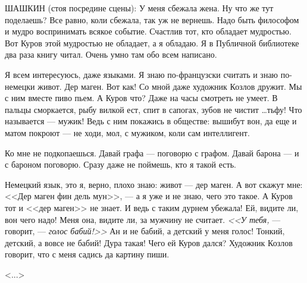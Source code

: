 ШАШКИН (стоя посредине сцены): У меня сбежала жена. Ну что же тут поделаешь? Все равно, коли сбежала, так уж не вернешь. Надо быть философом и мудро воспринимать всякое событие. Счастлив тот, кто обладает мудростью. Вот Куров этой мудростью не обладает, а я обладаю. Я в Публичной библиотеке два раза книгу читал. Очень умно там обо всем написано.

Я всем интересуюсь, даже языками. Я знаю по-французски считать и знаю по-немецки живот. Дер маген. Вот как! Со мной даже художник Козлов дружит. Мы с ним вместе пиво пьем. А Куров что? Даже на часы смотреть не умеет. В пальцы сморкается, рыбу вилкой ест, спит в сапогах, зубов не чистит \dots тьфу! Что называется --- мужик! Ведь с ним покажись в обществе: вышибут вон, да еще и матом покроют --- не ходи, мол, с мужиком, коли сам интеллигент.

Ко мне не подкопаешься. Давай графа --- поговорю с графом. Давай барона --- и с бароном поговорю. Сразу даже не поймешь, кто я такой есть.

Немецкий язык, это я, верно, плохо знаю: живот --- дер маген. А вот скажут мне: <<Дер маген фин дель мун>>, --- а я уже и не знаю, чего это такое. А Куров тот и <<дер маген>> не знает. И ведь с таким дурнем убежала! Ей, видите ли, вон чего надо! Меня она, видите ли, за мужчину не считает. \textit{<<У тебя,} --- говорит, --- \textit{голос бабий!>>} Ан и не бабий, а детский у меня голос! Тонкий, детский, а вовсе не бабий! Дура такая! Чего ей Куров дался? Художник Козлов говорит, что с меня садись да картину пиши.

\vspace{0.5em}
\hfill \textless ...\textgreater